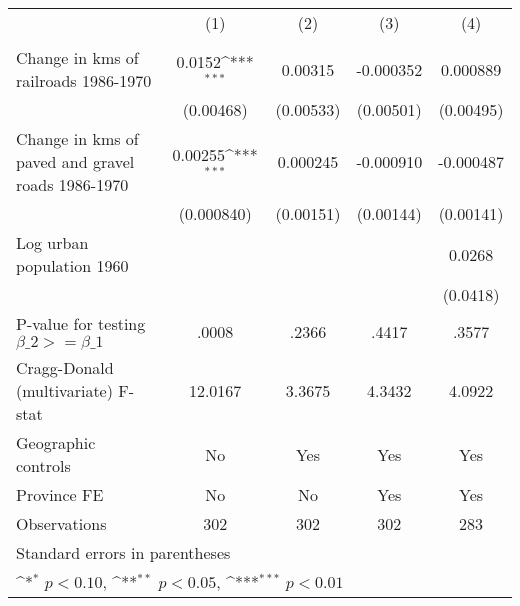 {
\def\sym#1{\ifmmode^{#1}\else\(^{#1}\)\fi}
\begin{tabular}{l*{4}{c}}
\hline\hline
                &\multicolumn{1}{c}{(1)}&\multicolumn{1}{c}{(2)}&\multicolumn{1}{c}{(3)}&\multicolumn{1}{c}{(4)}\\
                &\multicolumn{1}{c}{}&\multicolumn{1}{c}{}&\multicolumn{1}{c}{}&\multicolumn{1}{c}{}\\
\hline
Change in kms of railroads 1986-1970&   0.0152\sym{***}&  0.00315         &-0.000352         & 0.000889         \\
                &(0.00468)         &(0.00533)         &(0.00501)         &(0.00495)         \\
[1em]
Change in kms of paved and gravel roads 1986-1970&  0.00255\sym{***}& 0.000245         &-0.000910         &-0.000487         \\
                &(0.000840)         &(0.00151)         &(0.00144)         &(0.00141)         \\
[1em]
Log urban population 1960&                  &                  &                  &   0.0268         \\
                &                  &                  &                  & (0.0418)         \\
\hline
P-value for testing $\beta\_{2} >= \beta\_{1}$&    .0008         &    .2366         &    .4417         &    .3577         \\
Cragg-Donald (multivariate) F-stat&  12.0167         &   3.3675         &   4.3432         &   4.0922         \\
Geographic controls&       No         &      Yes         &      Yes         &      Yes         \\
Province FE     &       No         &       No         &      Yes         &      Yes         \\
Observations    &      302         &      302         &      302         &      283         \\
\hline\hline
\multicolumn{5}{l}{\footnotesize Standard errors in parentheses}\\
\multicolumn{5}{l}{\footnotesize \sym{*} \(p<0.10\), \sym{**} \(p<0.05\), \sym{***} \(p<0.01\)}\\
\end{tabular}
}
